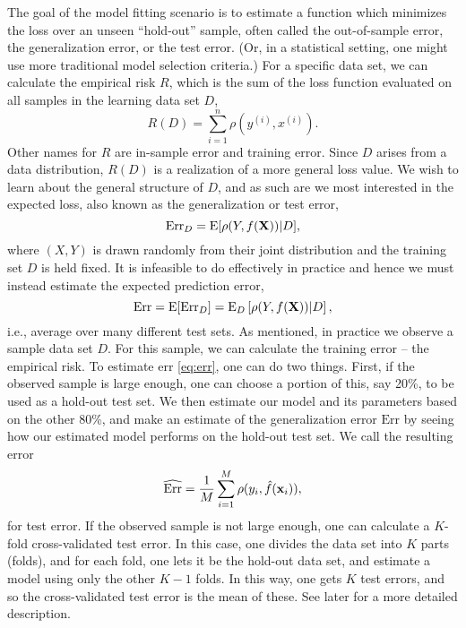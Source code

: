 The goal of the model fitting scenario is to estimate a function which minimizes the loss over an unseen ``hold-out'' sample, often called the out-of-sample error, the generalization error, or the test error. (Or, in a statistical setting, one might use more traditional model selection criteria.) For a specific data set, we can calculate the empirical risk $R$, which is the sum of the loss function evaluated on all samples in the learning data set $D$,
\begin{equation}\label{eq:empirical-risk-2}
    R(D)=\sum_{i=1}^n\rho(y^{(i)},x^{(i)}).
\end{equation}
Other names for $R$ are in-sample error and training error. Since $D$ arises from a data distribution, $R(D)$ is a realization of a more general loss value. We wish to learn about the general structure of $D$, and as such are we most interested in the expected loss, also known as the generalization or test error,
\begin{equation*}
    \text{Err}_{D}=\operatorname{E}[\rho(Y,f(\mathbf{X}))|D],
\end{equation*}
where $(X,Y)$ is drawn randomly from their joint distribution and the training set $D$ is held fixed. It is infeasible to do effectively in practice
and hence we must instead estimate the expected prediction error,
\begin{equation}\label{eq:err}
    \text{Err}=\operatorname{E}[\text{Err}_D]=\operatorname{E}_D\left[\rho(Y,f(\mathbf{X}))|D\right],
\end{equation}
i.e., average over many different test sets. As mentioned, in practice we observe a sample data set $D$. For this sample, we can calculate the training error -- the empirical risk. To estimate $\text{err}$ \eqref{eq:err}, one can do two things. First, if the observed sample is large enough, one can choose a portion of this, say 20\%, to be used as a hold-out test set. We then estimate our model and its parameters based on the other 80\%, and make an estimate of the generalization error $\text{Err}$ by seeing how our estimated model performs on the hold-out test set. We call the resulting error
\begin{equation*}
    \widehat{\text{Err}}=\frac{1}{M}\sum_{i=1}^M \rho(y_i,\hat{f}(\mathbf{x}_i)),
\end{equation*}
for test error. If the observed sample is not large enough, one can calculate a $K$-fold cross-validated test error. In this case, one divides the data set into $K$ parts (folds), and for each fold, one lets it be the hold-out data set, and estimate a model using only the other $K-1$ folds. In this way, one gets $K$ test errors, and so the cross-validated test error is the mean of these. See later for a more detailed description.

